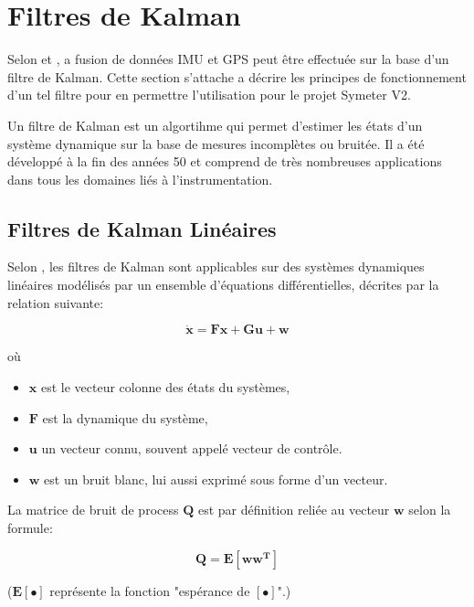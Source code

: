 \documentclass[12pt,a4paper]{report}
\begin{document}
	
	\section{Filtres de Kalman}
	
	Selon \cite{gustavsson_uav_2015} et \cite{menegatti_generalized_2016}, a fusion de données IMU et GPS peut être effectuée sur la base d'un filtre de Kalman. Cette section s'attache a décrire les principes de fonctionnement d'un tel filtre pour en permettre l'utilisation pour le projet Symeter V2.
	
	\para Un filtre de Kalman est un algortihme qui permet d'estimer les états d'un système dynamique sur la base  de mesures incomplètes ou bruitée. Il a été développé à la fin des années 50 et comprend de très nombreuses applications dans tous les domaines liés à l'instrumentation.
	
	\subsection{Filtres de Kalman Linéaires}
	Selon \cite{zarchan_fundamentals_2009}, les filtres de Kalman sont applicables sur des systèmes dynamiques linéaires modélisés par un ensemble d'équations différentielles, décrites par la relation suivante:
	
	\begin{equation}
		\label{eq:fullmodel}
	\boldsymbol{
		\dot{x} = Fx + Gu + w
	}
	\end{equation}
	
	\para où

	\begin{itemize}
	\item $\boldsymbol{x}$ est le vecteur colonne des états du systèmes, 
	\item $\boldsymbol{F}$ est la dynamique du système, 
	\item $\boldsymbol{u}$  un vecteur connu, souvent appelé vecteur de contrôle.
	\item $\boldsymbol{w}$ est un bruit blanc, lui aussi exprimé sous forme d'un vecteur.
	\end{itemize}

	La matrice de bruit de process \(\boldsymbol{Q}\) est par définition reliée au vecteur \(\boldsymbol{w}\) selon la formule:

	\begin{equation}
		\boldsymbol{Q = E[ww^T]}
	\end{equation}

	($\boldsymbol{E[\bullet]}$ représente la fonction "espérance de \([\bullet]\)".)
	
\end{document}
